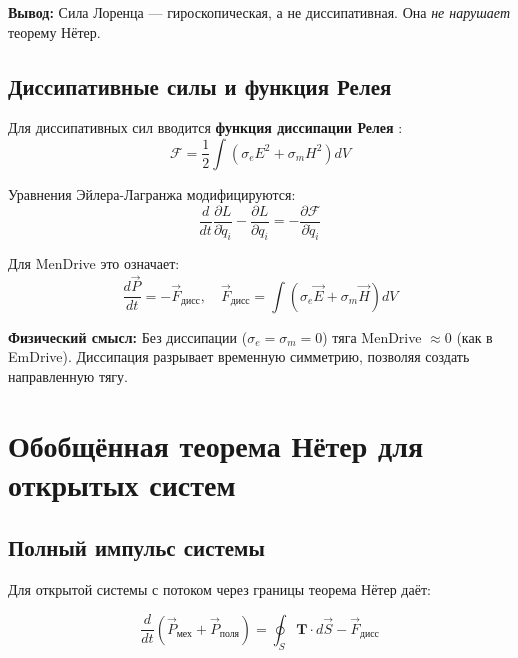 \documentclass[a4paper,12pt]{article}
\begin{document}
\textbf{Вывод:} Сила Лоренца --- гироскопическая, а не диссипативная.
Она \textit{не нарушает} теорему Нётер.

\subsection{Диссипативные силы и функция Релея}

Для диссипативных сил вводится \textbf{функция диссипации Релея} \cite{Rayleigh}:
\begin{equation}
\mathcal{F} = \frac{1}{2}\int \left(\sigma_e E^2 + \sigma_m H^2\right) dV
\label{eq:rayleigh_function}
\end{equation}

Уравнения Эйлера-Лагранжа модифицируются:
\begin{equation}
\frac{d}{dt}\frac{\partial L}{\partial \dot{q}_i} - \frac{\partial L}{\partial q_i} =
-\frac{\partial \mathcal{F}}{\partial \dot{q}_i}
\label{eq:euler_lagrange_dissipative}
\end{equation}

Для MenDrive это означает:
\begin{equation}
\frac{d\vec{P}}{dt} = -\vec{F}_{\text{дисс}}, \quad
\vec{F}_{\text{дисс}} = \int\left(\sigma_e\vec{E} + \sigma_m\vec{H}\right)dV
\label{eq:momentum_dissipation}
\end{equation}

\textbf{Физический смысл:} Без диссипации ($\sigma_e = \sigma_m = 0$)
тяга MenDrive $\approx 0$ (как в EmDrive). Диссипация разрывает временную
симметрию, позволяя создать направленную тягу.

\section{Обобщённая теорема Нётер для открытых систем}

\subsection{Полный импульс системы}

Для открытой системы с потоком через границы теорема Нётер даёт:

\begin{equation}
\boxed{
\frac{d}{dt}\left(\vec{P}_{\text{мех}} + \vec{P}_{\text{поля}}\right) =
\oint_{S} \mathbf{T}\cdot d\vec{S} - \vec{F}_{\text{дисс}}
}
\label{eq:noether_open_system}
\end{equation}
\end{document}
